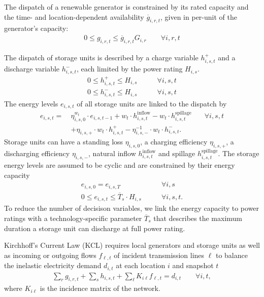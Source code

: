 The dispatch of a renewable generator is constrained by
its rated capacity and the time- and location-dependent availability $\overline{g}_{i,r,t}$,
given in per-unit of the generator's capacity:
\begin{align}
    0 \leq g_{i,r,t} \leq \overline{g}_{i,r,t} G_{i,r} \qquad\forall i, r, t
\end{align}

The dispatch of storage units is described by a charge variable $h_{i,s,t}^+$
and a discharge variable $h_{i,s,t}^-$, each limited by the power rating $H_{i,s}$.
\begin{align}
    0 \leq h_{i,s,t}^+ \leq H_{i,s} &\qquad\forall i, s, t \\
    0 \leq h_{i,s,t}^- \leq H_{i,s} &\qquad\forall i, s, t
\end{align}
The energy levels $e_{i,s,t}$ of all storage units are linked to the dispatch by
\begin{align}
    e_{i,s,t} =\: & \eta_{i,s,0}^{w_t} \cdot e_{i,s,t-1} + w_t \cdot h_{i,s,t}^\text{inflow} - w_t \cdot h_{i,s,t}^\text{spillage} & \quad\forall i, s, t \nonumber \\
    & + \eta_{i,s,+} \cdot w_t \cdot h_{i,s,t}^+ - \eta_{i,s,-}^{-1} \cdot w_t \cdot h_{i,s,t}^-.
\end{align}
Storage units can have a standing loss $\eta_{i,s,0}$, a charging efficiency $\eta_{i,s,+}$, a discharging efficiency $\eta_{i,s,-}$,
natural inflow $h_{i,s,t}^\text{inflow}$ and spillage $h_{i,s,t}^\text{spillage}$.
The storage energy levels are assumed to be cyclic and are constrained by their energy capacity
\begin{align}
    e_{i,s,0} = e_{i,s,T} &\qquad\forall i, s \\
    0 \leq e_{i,s,t} \leq \overline{T}_s \cdot H_{i,s} &\qquad\forall i, s, t.
\end{align}
To reduce the number of decisison variables, we link the energy capacity to
power ratings with a technology-specific parameter $\overline{T}_s$
that describes the maximum duration a storage unit can discharge at full power rating.

Kirchhoff's Current Law (KCL) requires local generators and storage units as well as
incoming or outgoing flows $f_{\ell,t}$ of incident transmission lines $\ell$
to balance the inelastic electricity demand $d_{i,t}$ at each location $i$ and snapshot $t$
\begin{align}
    \sum_r g_{i,r,t} + \sum_s h_{i,s,t} + \sum_\ell K_{i\ell} f_{\ell,t} = d_{i,t} \qquad\forall i,t,
\end{align}
where $K_{i\ell}$ is the incidence matrix of the network.

